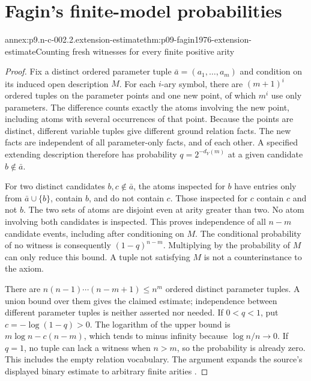 
\section{Fagin's finite-model probabilities}
\label{sec:annex-p09-n-c-002-02}

\begin{annexitem}{annex:p9.n-c-002.2.extension-estimate}{thm:p09-fagin1976-extension-estimate}{Counting fresh witnesses for every finite positive arity}
\begin{proof}
Fix a distinct ordered parameter tuple \(\bar a=(a_1,\ldots,a_m)\)
and condition on its induced open description \(M\).  For each
\(i\)-ary symbol, there are \((m+1)^i\) ordered tuples on the
parameter points and one new point, of which \(m^i\) use only
parameters.  The difference counts exactly the atoms involving the new
point, including atoms with several occurrences of that point.  Because
the points are distinct, different variable tuples give different ground
relation facts.  The new facts are independent of all parameter-only
facts, and of each other.  A specified extending description therefore
has probability \(q=2^{-d_Y(m)}\) at a given candidate \(b\notin\bar a\).

For two distinct candidates \(b,c\notin\bar a\), the atoms inspected
for \(b\) have entries only from \(\bar a\cup\{b\}\), contain
\(b\), and do not contain \(c\).  Those inspected for \(c\) contain
\(c\) and not \(b\).  The two sets of atoms are disjoint even at
arity greater than two.  No atom involving both candidates is inspected.
This proves independence of all \(n-m\) candidate events, including
after conditioning on \(M\).  The conditional probability of no witness
is consequently \((1-q)^{n-m}\).  Multiplying by the probability of
\(M\) can only reduce this bound.  A tuple not satisfying \(M\) is
not a counterinstance to the axiom.

There are \(n(n-1)\cdots(n-m+1)\leq n^m\) ordered distinct
parameter tuples.  A union bound over them gives the claimed estimate;
independence between different parameter tuples is neither asserted nor
needed.  If \(0<q<1\), put \(c=-\log(1-q)>0\).  The logarithm
of the upper bound is \(m\log n-c(n-m)\), which tends to minus
infinity because \(\log n/n\to0\).  If \(q=1\), no tuple
can lack a witness when \(n>m\), so the probability is already zero.
This includes the empty relation vocabulary.  The argument expands the
source's displayed binary estimate to arbitrary finite arities
\cite[thm.~2, p.~52]{Fagin1976}.
\end{proof}
\end{annexitem}

